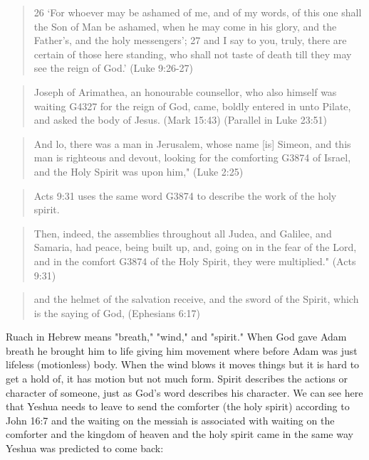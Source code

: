 \documentclass[11pt]{article}
\begin{document}
\begin{quote}
26 `For whoever may be ashamed of me, and of my words, of this one shall the Son of Man be ashamed, when he may come in his glory, and the Father's, and the holy messengers';
27 and I say to you, truly, there are certain of those here standing, who shall not taste of death till they may see the reign of God.' (Luke 9:26-27) 
\end{quote}
\begin{quote}
Joseph of Arimathea, an honourable counsellor, who also himself was waiting G4327 for the reign of God, came, boldly entered in unto Pilate, and asked the body of Jesus. (Mark 15:43) (Parallel in Luke 23:51)
\end{quote}
\begin{quote}
And lo, there was a man in Jerusalem, whose name [is] Simeon, and this man is righteous and devout, looking for the comforting G3874 of Israel, and the Holy Spirit was upon him," (Luke 2:25)
\end{quote}
\begin{quote}
Acts 9:31 uses the same word G3874 to describe the work of the holy spirit.
\end{quote}
\begin{quote}
 Then, indeed, the assemblies throughout all Judea, and Galilee, and Samaria, had peace, being built up, and, going on in the fear of the Lord, and in the comfort G3874 of the Holy Spirit, they were multiplied." (Acts 9:31)
\end{quote}
\begin{quote}
and the helmet of the salvation receive, and the sword of the Spirit, which is the saying of God, (Ephesians 6:17)
\end{quote}
Ruach in Hebrew means "breath," "wind," and "spirit." When God gave Adam breath he brought him to life giving him movement where before Adam was just lifeless (motionless) body. When the wind blows it moves things but it is hard to get a hold of, it has motion but not much form. Spirit describes the actions or character of someone, just as God's word describes his character. We can see here that Yeshua needs to leave to send the comforter (the holy spirit) according to John 16:7 and the waiting on the messiah is associated with waiting on the comforter and the kingdom of heaven and the holy spirit came in the same way Yeshua was predicted to come back:
\end{document}
